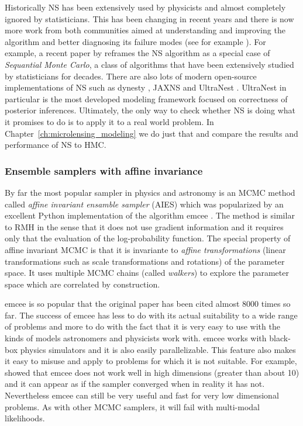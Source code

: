\documentclass[12pt,dvipsnames]{report}
\newcommand{\ssf}[1]{\textsf{#1}}
\begin{document}
Historically NS has been  extensively used by physicists and almost completely 
ignored by statisticians. This has been changing in recent years and there 
is now more work from both communities aimed at understanding and improving the 
algorithm and better diagnosing its failure modes (see for example 
\citet{ arXiv:1407.5459,arXiv:1804.06406,arXiv:1704.03459,arXiv:2101.09675}).
For example, a recent paper by \citet{arXiv:1805.03924}  reframes the NS 
algorithm as a special case of \textsl{Sequantial Monte Carlo}, a class of 
algorithms that have been extensively studied by statisticians for decades.
There are also lots of modern open-source implementations of NS such as 
\ssf{dynesty} \citep{arXiv:1904.02180}, \ssf{JAXNS} \citep{arXiv:2012.15286}
and \ssf{UltraNest} \citep{2021JOSS....6.3001B}. 
\ssf{UltraNest} in particular is the most developed modeling framework 
focused on correctness of posterior inferences. Ultimately, the only way 
to check whether NS is doing what it promises to do is to apply it to a real 
world problem. In Chapter~\ref{ch:microlensing_modeling} we do just that and compare 
the results and performance of NS to HMC.

\subsubsection{Ensemble samplers with affine invariance}
By far the most popular sampler in physics and astronomy is an MCMC method 
called \textsl{affine invariant ensamble sampler} (AIES)
\citep{2010CAMCS...5...65G} which was popularized by an excellent \ssf{Python}
implementation of the algorithm \ssf{emcee} 
\citep{arXiv:1202.3665,arXiv:1911.07688}. The method is similar 
to RMH  in the sense that it does not use gradient information and it requires 
only that the evaluation of the log-probability function. The special property 
of affine invariant MCMC is that it is invariante to 
\textsl{affine transformations} (linear transformations such as 
scale transformations and rotations) of the parameter space. It uses multiple 
MCMC chains (called \textsl{walkers}) to explore the parameter space which 
are correlated by construction. 

\ssf{emcee} is so popular that the 
original paper has been cited almost 8000 times so far.  
The success of \ssf{emcee} has less to do with its actual suitability 
to a wide range  of problems and more to do with the fact that it is very easy to use with the 
kinds of models astronomers and physicists work with. \ssf{emcee}  works with
black-box physics simulators and it is also easily parallelizable. 
This feature also makes it easy to misuse and apply to problems for which it is 
not suitable. For example, \citet{arXiv:1509.02230} showed that \ssf{emcee} 
does not work well in high dimensions (greater than about 10) and it can appear 
as if the sampler converged when in reality it has not. Nevertheless 
\ssf{emcee} can still be very useful and fast for very low dimensional 
problems. As with other MCMC samplers, it will fail with multi-modal 
likelihoods.
\end{document}
